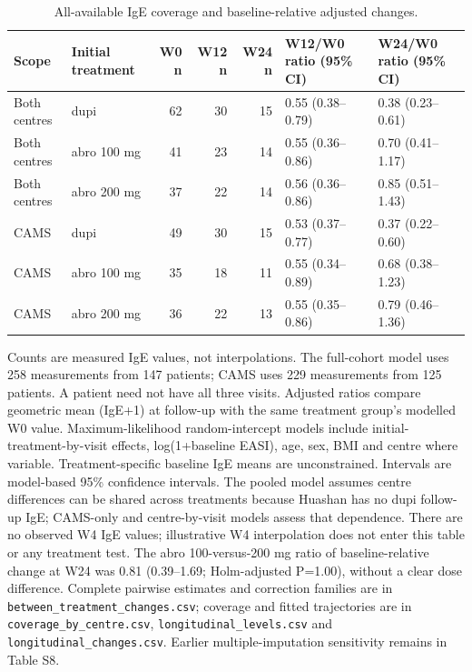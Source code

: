 \begin{table}[htbp]
\centering\small
\caption{All-available IgE coverage and baseline-relative adjusted changes.}\label{tab:ige_all_available}
\begin{tabular}{p{19mm}p{25mm}rrrp{31mm}p{31mm}}\toprule
Scope & Initial treatment & W0 n & W12 n & W24 n & W12/W0 ratio (95\% CI) & W24/W0 ratio (95\% CI) \\ \midrule
Both centres & dupi & 62 & 30 & 15 & 0.55 (0.38--0.79) & 0.38 (0.23--0.61) \\
Both centres & abro 100 mg & 41 & 23 & 14 & 0.55 (0.36--0.86) & 0.70 (0.41--1.17) \\
Both centres & abro 200 mg & 37 & 22 & 14 & 0.56 (0.36--0.86) & 0.85 (0.51--1.43) \\
\addlinespace
CAMS & dupi & 49 & 30 & 15 & 0.53 (0.37--0.77) & 0.37 (0.22--0.60) \\
CAMS & abro 100 mg & 35 & 18 & 11 & 0.55 (0.34--0.89) & 0.68 (0.38--1.23) \\
CAMS & abro 200 mg & 36 & 22 & 13 & 0.55 (0.35--0.86) & 0.79 (0.46--1.36) \\
\bottomrule\end{tabular}
\par\small\raggedright Counts are measured IgE values, not interpolations. The full-cohort model uses 258 measurements from 147 patients; CAMS uses 229 measurements from 125 patients. A patient need not have all three visits. Adjusted ratios compare geometric mean (IgE+1) at follow-up with the same treatment group's modelled W0 value. Maximum-likelihood random-intercept models include initial-treatment-by-visit effects, log(1+baseline EASI), age, sex, BMI and centre where variable. Treatment-specific baseline IgE means are unconstrained. Intervals are model-based 95\% confidence intervals. The pooled model assumes centre differences can be shared across treatments because Huashan has no dupi follow-up IgE; CAMS-only and centre-by-visit models assess that dependence. There are no observed W4 IgE values; illustrative W4 interpolation does not enter this table or any treatment test. The abro 100-versus-200 mg ratio of baseline-relative change at W24 was 0.81 (0.39--1.69; Holm-adjusted P=1.00), without a clear dose difference. Complete pairwise estimates and correction families are in \texttt{between\_treatment\_changes.csv}; coverage and fitted trajectories are in \texttt{coverage\_by\_centre.csv}, \texttt{longitudinal\_levels.csv} and \texttt{longitudinal\_changes.csv}. Earlier multiple-imputation sensitivity remains in Table S8.
\end{table}
